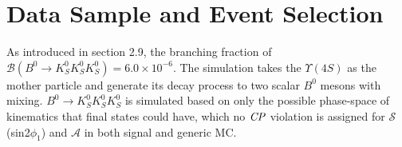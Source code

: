 \section{Data Sample and Event Selection}

As introduced in section 2.9, the branching fraction of $\mathcal{B}(B^0 \to K_S^0  K_S^0  K_S^0) = 6.0 \times 10^{-6}$. The simulation takes the $\Upsilon(4S)$ as the mother particle and generate its decay process to two scalar $B^0$ mesons with mixing. $B^0 \to K_S^0  K_S^0  K_S^0$ is simulated based on only the possible phase-space of kinematics that final states could have, which no $\it{CP}$ violation is assigned for $\mathcal{S}$(sin2$\phi_1$) and $\mathcal{A}$ in both signal and generic MC.

